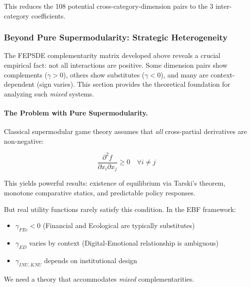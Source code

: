 This reduces the 108 potential cross-category-dimension pairs to the 3 
inter-category coefficients.





\subsubsection{Beyond Pure Supermodularity: Strategic Heterogeneity}
\label{sec:strategic-heterogeneity}

The FEPSDE complementarity matrix developed above reveals a crucial empirical 
fact: not all interactions are positive. Some dimension pairs show complements 
($\gamma > 0$), others show substitutes ($\gamma < 0$), and many are context-dependent 
(sign varies). This section provides the theoretical foundation for analyzing 
such \emph{mixed} systems.

\paragraph{The Problem with Pure Supermodularity.}
Classical supermodular game theory \citep{topkis1998} assumes that \emph{all} 
cross-partial derivatives are non-negative:

\begin{equation}
\frac{\partial^2 f}{\partial x_i \partial x_j} \geq 0 \quad \forall i \neq j
\end{equation}

This yields powerful results: existence of equilibrium via Tarski's theorem, 
monotone comparative statics, and predictable policy responses.

But real utility functions rarely satisfy this condition. In the EBF framework:
\begin{itemize}
    \item $\gamma_{FEc} < 0$ (Financial and Ecological are typically substitutes)
    \item $\gamma_{ED}$ varies by context (Digital-Emotional relationship is ambiguous)
    \item $\gamma_{INU,KNU}$ depends on institutional design
\end{itemize}

We need a theory that accommodates \emph{mixed} complementarities.

